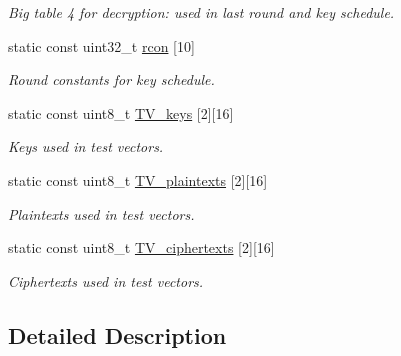 \begin{DoxyCompactItemize}
\begin{DoxyCompactList}\small\item\em Big table 4 for decryption\+: used in last round and key schedule. \end{DoxyCompactList}\item 
\hypertarget{classAES_ab33e867902cacf34d852ca20acbbdae7}{}static const uint32\+\_\+t \hyperlink{classAES_ab33e867902cacf34d852ca20acbbdae7}{rcon} \mbox{[}10\mbox{]}\label{classAES_ab33e867902cacf34d852ca20acbbdae7}

\begin{DoxyCompactList}\small\item\em Round constants for key schedule. \end{DoxyCompactList}\item 
\hypertarget{classAES_a65bf8231599aa5f7181d2a133ad2d120}{}static const uint8\+\_\+t \hyperlink{classAES_a65bf8231599aa5f7181d2a133ad2d120}{T\+V\+\_\+keys} \mbox{[}2\mbox{]}\mbox{[}16\mbox{]}\label{classAES_a65bf8231599aa5f7181d2a133ad2d120}

\begin{DoxyCompactList}\small\item\em Keys used in test vectors. \end{DoxyCompactList}\item 
\hypertarget{classAES_aeec3ff8f84e7e6fed30aa7c4a9ef0864}{}static const uint8\+\_\+t \hyperlink{classAES_aeec3ff8f84e7e6fed30aa7c4a9ef0864}{T\+V\+\_\+plaintexts} \mbox{[}2\mbox{]}\mbox{[}16\mbox{]}\label{classAES_aeec3ff8f84e7e6fed30aa7c4a9ef0864}

\begin{DoxyCompactList}\small\item\em Plaintexts used in test vectors. \end{DoxyCompactList}\item 
\hypertarget{classAES_a38c4a91722c03bf26dcf6c9e18fce63e}{}static const uint8\+\_\+t \hyperlink{classAES_a38c4a91722c03bf26dcf6c9e18fce63e}{T\+V\+\_\+ciphertexts} \mbox{[}2\mbox{]}\mbox{[}16\mbox{]}\label{classAES_a38c4a91722c03bf26dcf6c9e18fce63e}

\begin{DoxyCompactList}\small\item\em Ciphertexts used in test vectors. \end{DoxyCompactList}\end{DoxyCompactItemize}


\subsection{Detailed Description}


